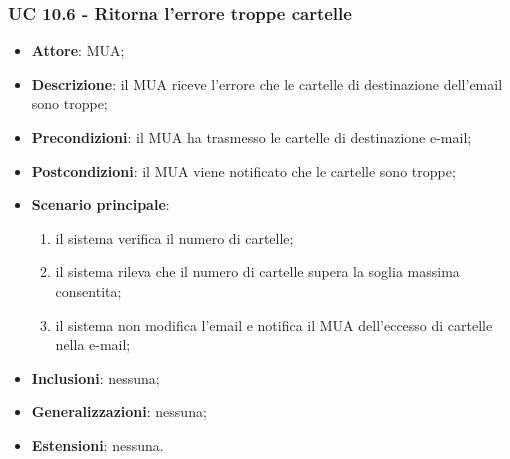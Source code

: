     \subsubsection{UC 10.6 - Ritorna l'errore troppe cartelle} \label{sec:UC10.6}
    \begin{itemize}
        \item \textbf{Attore}: MUA;
        \item \textbf{Descrizione}: il MUA riceve l'errore che le cartelle di destinazione dell'email sono troppe;
        \item \textbf{Precondizioni}: il MUA ha trasmesso le cartelle di destinazione e-mail;
        \item \textbf{Postcondizioni}: il MUA viene notificato che le cartelle sono troppe;
        \item \textbf{Scenario principale}:
            \begin{enumerate}
                \item il sistema verifica il numero di cartelle;
                \item il sistema rileva che il numero di cartelle supera la soglia massima consentita;
                \item il sistema non modifica l'email e notifica il MUA dell'eccesso di cartelle nella e-mail;
            \end{enumerate}
        \item \textbf{Inclusioni}: nessuna;
        \item \textbf{Generalizzazioni}: nessuna;
        \item \textbf{Estensioni}: nessuna.
    \end{itemize}
